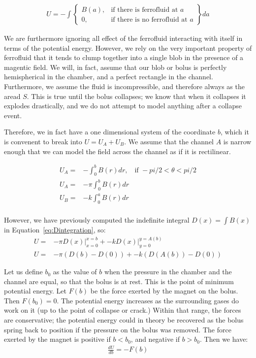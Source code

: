 \documentclass[]{asme2ej}
\begin{document}
\begin{align}
  U = -\int
\left\{
    \begin{array}{lr}
      B(a)  , & \text{if there is ferrofluid at } a \\
      0 , & \text{if there is no ferrofluid at } a
    \end{array}
\right\} da
\end{align}

We are furthermore ignoring all effect of the ferrofluid interacting with itself in terms
of the potential energy. However, we rely on the very important property of ferrofluid that
it tends to clump together into a single blob in the presence of a magentic field.
We will, in fact, assume that our blob or bolus is perfectly hemispherical in the chamber,
and a perfect rectangle in the channel. Furthermore, we assume the fluid is incompressible,
and therefore always as the aread $S$. This is true until the bolus collapses; we know that
when it collapses it explodes drastically, and we do not attempt to model anything after
a collapse event.

Therefore, we in fact have a one dimensional system of the coordinate $b$, which
it is convenent to break into $U = U_A + U_B$. We assume that the channel $A$ is narrow
enough that we can model the field across the channel as if it is rectilinear.

\begin{align}
  U_A = & -\int_0^b B(r) dr , & \text{if } -pi/2 < \theta < pi/2 \\
  U_A = & -\pi \int_0^b B(r) dr \\
  U_B = & -k\int_0^a B(r) dr\\
\end{align}

However, we have previously computed the indefinite integral $D(x) = \int B(x)$ in Equation~\ref{eq:Dintegration},
so:
\begin{align}
  U = & -\pi D(x) \vert_{x=0}^{x=b}  + -k D(x)\vert_{y=0}^{y=A(b)} \\
  U = & -\pi (D(b) - D(0)) + -k (D(A(b)) - D(0))
  \label{eq:U}
\end{align}


Let us define $b_0$ as the value of $b$ when the pressure in the chamber and the channel are equal,
so that the bolus is at rest. This is the point of minimum potential energy.
Let $F(b)$ be the force exerted by the magnet on the bolus.
Then $F(b_0) = 0$.
The potential energy increases as the surrounding gases do work on it (up to the point of collapse
or crack.) Within that range, the forces are conservative; the potential energy could in theory
be recovered as the bolus spring back to position if the pressure on the bolus was removed.
The force exerted by the magnet is positive if $b < b_0$, and negative if $b > b_0$.
Then we have:
\begin{align}
  \frac{d U}{db} =  -F(b)
\end{align}
\end{document}
